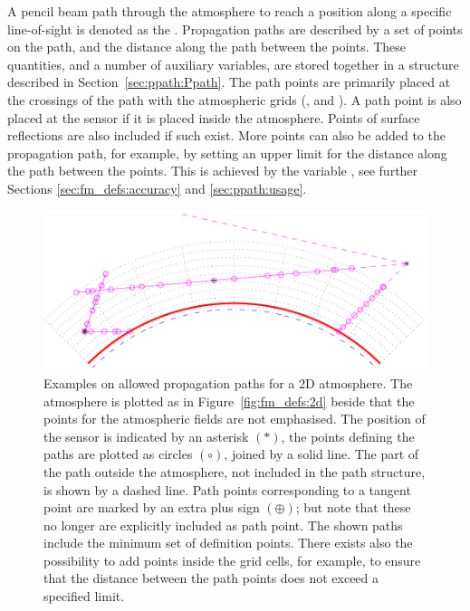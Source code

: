 A pencil beam path through the atmosphere to reach a position along a specific
line-of-sight is denoted as the . Propagation paths
are described by a set of points on the path, and the distance along the path
between the points. These quantities, and a number of auxiliary variables, are
stored together in a structure described in Section~\ref{sec:ppath:Ppath}. The
path points are primarily placed at the crossings of the path with the
atmospheric grids (,  and
). A path point is also placed at the sensor if it is
placed inside the atmosphere. Points of surface reflections
are also included if such exist. More points can also be added to the
propagation path, for example, by setting an upper limit for the distance along
the path between the points. This is achieved by the variable
, see further Sections \ref{sec:fm_defs:accuracy} and
\ref{sec:ppath:usage}.

\begin{figure}[p]
 \begin{center}
  \includegraphics*[width=0.99\hsize]{ppath_cases2}
  \caption{Examples on allowed propagation paths for a 2D atmosphere. 
    The atmosphere is plotted as in Figure~\ref{fig:fm_defs:2d} beside
    that the points for the atmospheric fields are not emphasised.
    The position of the sensor is indicated by an asterisk $(\ast)$,
    the points defining the paths are plotted as circles $(\circ)$,
    joined by a solid line. The part of the path outside the
    atmosphere, not included in the path structure, is shown by a
    dashed line. Path points corresponding to a tangent point are
    marked by an extra plus sign $(\oplus)$; but note that these no
    longer are explicitly included as path point. The shown paths include
    the minimum set of definition points. There exists also the
    possibility to add points inside the grid cells, for example, to
    ensure that the distance between the path points does not exceed
    a specified limit.}
  \label{fig:fm_defs:ppath_cases2}
 \end{center}
\end{figure}

